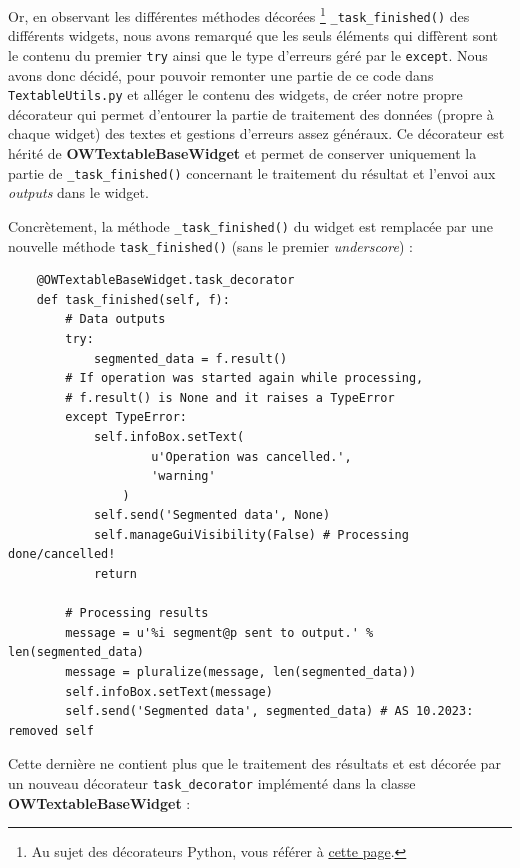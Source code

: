 \documentclass{article}
\begin{document}
Or, en observant les différentes méthodes décorées \footnote{Au sujet des décorateurs Python, vous référer à \href{https://www.geeksforgeeks.org/decorators-in-python/}{cette page}.} \texttt{\_task\_finished()} des différents widgets, nous avons remarqué que les seuls éléments qui diffèrent sont le contenu du premier \texttt{try} ainsi que le type d'erreurs géré par le \texttt{except}. Nous avons donc décidé, pour pouvoir remonter une partie de ce code dans \texttt{TextableUtils.py} et alléger le contenu des widgets, de créer notre propre décorateur qui permet d'entourer la partie de traitement des données (propre à chaque widget) des textes et gestions d'erreurs assez généraux. Ce décorateur est hérité de \textbf{OWTextableBaseWidget} et permet de conserver uniquement la partie de \texttt{\_task\_finished()} concernant le traitement du résultat et l'envoi aux \textit{outputs} dans le widget.

Concrètement, la méthode \texttt{\_task\_finished()} du widget est remplacée par une nouvelle méthode \texttt{task\_finished()} (sans le premier \textit{underscore}) : 

\begin{verbatim}
    @OWTextableBaseWidget.task_decorator
    def task_finished(self, f):
        # Data outputs
        try:
            segmented_data = f.result()
        # If operation was started again while processing,
        # f.result() is None and it raises a TypeError
        except TypeError:
            self.infoBox.setText(
                    u'Operation was cancelled.',
                    'warning'
                )
            self.send('Segmented data', None)
            self.manageGuiVisibility(False) # Processing done/cancelled!
            return

        # Processing results
        message = u'%i segment@p sent to output.' % len(segmented_data)
        message = pluralize(message, len(segmented_data))
        self.infoBox.setText(message)
        self.send('Segmented data', segmented_data) # AS 10.2023: removed self
\end{verbatim}

Cette dernière ne contient plus que le traitement des résultats et est décorée par un nouveau décorateur \texttt{task\_decorator} implémenté dans la classe \textbf{OWTextableBaseWidget} : 
\end{document}
